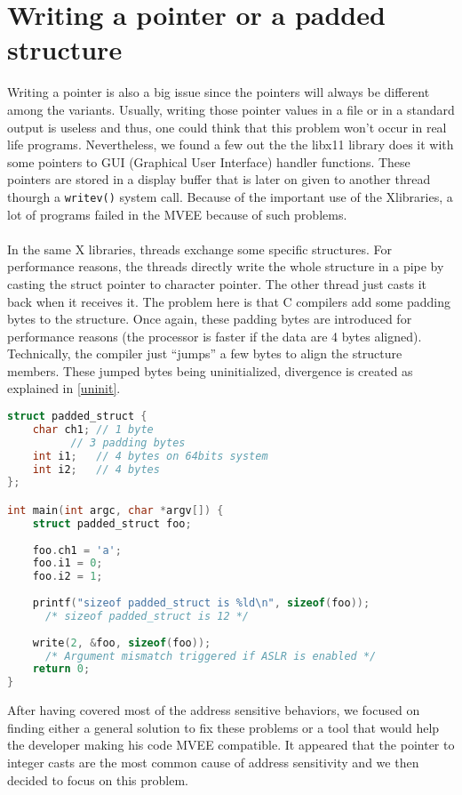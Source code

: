 \documentclass[english]{enstaPRE}
\begin{document}
\section{Writing a pointer or a padded structure}

Writing a pointer is also a big issue since the pointers will always be different among the variants.
Usually, writing those pointer values in a file or in a standard output is useless and thus, one could think that this problem won't occur in
real life programs. Nevertheless, we found a few out the the libx11 library does it with some pointers to GUI 
(Graphical User Interface) handler functions. These pointers are stored in a display buffer that is later on given to another thread 
thourgh a \texttt{writev()} system call.
Because of the important use of the Xlibraries, a lot of programs failed in the MVEE because of such problems.
\\ \\
In the same X libraries, threads exchange some specific structures. For performance reasons, the threads directly write the whole 
structure in a pipe by casting the struct pointer to character pointer. The other thread just casts it back when it receives it.
The problem here is that C compilers add some padding bytes to the structure. Once again, these padding bytes are introduced for performance
reasons (the processor is faster if the data are 4 bytes aligned). Technically, the compiler just ``jumps'' a few bytes to align 
the structure members. These jumped bytes being uninitialized, divergence is created as explained in \ref{uninit}. \\

\begin{lstlisting}[frame=single, caption=Writing a padded structure, label=lst:padstruct, language=C]
struct padded_struct {
    char ch1; // 1 byte
	      // 3 padding bytes
    int i1;   // 4 bytes on 64bits system
    int i2;   // 4 bytes
};

int main(int argc, char *argv[]) {
    struct padded_struct foo;
    
    foo.ch1 = 'a';
    foo.i1 = 0;
    foo.i2 = 1;
    
    printf("sizeof padded_struct is %ld\n", sizeof(foo)); 
      /* sizeof padded_struct is 12 */
    
    write(2, &foo, sizeof(foo));
      /* Argument mismatch triggered if ASLR is enabled */
    return 0;
}
\end{lstlisting}


After having covered most of the address sensitive behaviors, we focused on finding either a general solution to fix these 
problems or a tool that would help the developer making his code MVEE compatible.
It appeared that the pointer to integer casts are the most common cause of address sensitivity and we then decided to focus on this 
problem.
\end{document}
